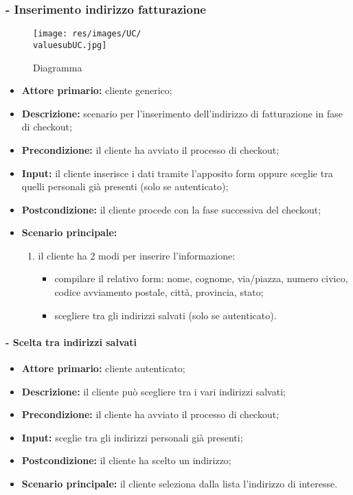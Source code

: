 \stepsubUserCase
\subsubsection{ - Inserimento indirizzo fatturazione}
\begin{figure}[H]
    \centering
    \texttt{[image: res/images/UC/\\valuesubUC.jpg]}
    \caption{Diagramma }
\end{figure}
\begin{itemize}
    \item \textbf{Attore primario:} cliente generico;
    \item \textbf{Descrizione:} scenario per l'inserimento dell'indirizzo di fatturazione in fase di checkout;
    \item \textbf{Precondizione:} il cliente ha avviato il processo di checkout;
    \item \textbf{Input:} il cliente inserisce i dati tramite l'apposito form oppure sceglie tra quelli personali già presenti (solo se autenticato);
    \item \textbf{Postcondizione:} il cliente procede con la fase successiva del checkout;
    \item \textbf{Scenario principale:}
          \begin{enumerate}
              \item il cliente ha 2 modi per inserire l'informazione:
                    \begin{itemize}
                        \item compilare il relativo form: nome, cognome, via/piazza, numero civico, codice avviamento postale, città, provincia, stato;
                        \item scegliere tra gli indirizzi salvati (solo se autenticato).
                    \end{itemize}
          \end{enumerate}
\end{itemize}

\stepsubsubUserCase
\paragraph{ - Scelta tra indirizzi salvati}
\begin{itemize}
    \item \textbf{Attore primario:} cliente autenticato;
    \item \textbf{Descrizione:} il cliente può scegliere tra i vari indirizzi salvati;
    \item \textbf{Precondizione:} il cliente ha avviato il processo di checkout;
    \item \textbf{Input:} sceglie tra gli indirizzi personali già presenti;
    \item \textbf{Postcondizione:} il cliente ha scelto un indirizzo;
    \item \textbf{Scenario principale:}  il cliente seleziona dalla lista l'indirizzo di interesse.
\end{itemize}

